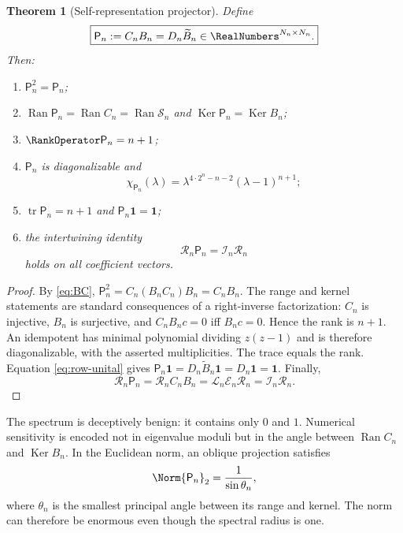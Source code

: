 \documentclass[11pt,oneside]{article}
\numberwithin{equation}{section}
\newtheorem{theorem}{Theorem}[section]
\theoremstyle{definition}
\theoremstyle{remark}
\newcommand{\Ran}{\operatorname{Ran}}
\newcommand{\Ker}{\operatorname{Ker}}
\newcommand{\tr}{\operatorname{tr}}
\newcommand{\Lag}{\mathcal I}
\newcommand{\Eval}{\mathcal E}
\newcommand{\Rec}{\mathcal L}
\newcommand{\Synth}{\mathcal R}
\newcommand{\Coeff}{\mathcal S}
\newcommand{\Proj}{\mathsf P}
\begin{document}
\begin{theorem}[Self-representation projector]
\label{thm:coefficient-projector}
Define
\begin{equation}
 \boxed{
 \Proj_n:=C_nB_n=D_n\widetilde B_n\in\RealNumbers^{N_n\times N_n}.
 }
 \label{eq:P-def}
\end{equation}
Then:
\begin{enumerate}
\item $\Proj_n^2=\Proj_n$;
\item $\Ran\Proj_n=\Ran C_n=\Ran\Coeff_n$ and
      $\Ker\Proj_n=\Ker B_n$;
\item $\RankOperator\Proj_n=n+1$;
\item $\Proj_n$ is diagonalizable and
\begin{equation}
 \chi_{\Proj_n}(\lambda)
 =\lambda^{4\cdot2^n-n-2}(\lambda-1)^{n+1};
 \label{eq:P-characteristic}
\end{equation}
\item $\tr\Proj_n=n+1$ and $\Proj_n\bm1=\bm1$;
\item the intertwining identity
\begin{equation}
 \Synth_n\Proj_n=\Lag_n\Synth_n
 \label{eq:intertwining}
\end{equation}
holds on all coefficient vectors.
\end{enumerate}
\end{theorem}

\begin{proof}
By \eqref{eq:BC},
$\Proj_n^2=C_n(B_nC_n)B_n=C_nB_n$.  The range and kernel statements are
standard consequences of a right-inverse factorization: $C_n$ is injective,
$B_n$ is surjective, and $C_nB_nc=0$ iff $B_nc=0$.  Hence the rank is $n+1$.
An idempotent has minimal polynomial dividing $z(z-1)$ and is therefore
diagonalizable, with the asserted multiplicities.  The trace equals the
rank.  Equation \eqref{eq:row-unital} gives
$\Proj_n\bm1=D_n\widetilde B_n\bm1=D_n\bm1=\bm1$.  Finally,
\[
 \Synth_n\Proj_n
 =\Synth_nC_nB_n
 =\Rec_n\Eval_n\Synth_n
 =\Lag_n\Synth_n.
\]
\end{proof}

The spectrum is deceptively benign: it contains only $0$ and $1$.  Numerical
sensitivity is encoded not in eigenvalue moduli but in the angle between
$\Ran C_n$ and $\Ker B_n$.  In the Euclidean norm, an oblique projection
satisfies
\begin{equation}
 \Norm{\Proj_n}_2=\frac1{\sin\theta_n},
 \label{eq:projector-angle}
\end{equation}
where $\theta_n$ is the smallest principal angle between its range and
kernel.  The norm can therefore be enormous even though the spectral radius
is one.
\end{document}
